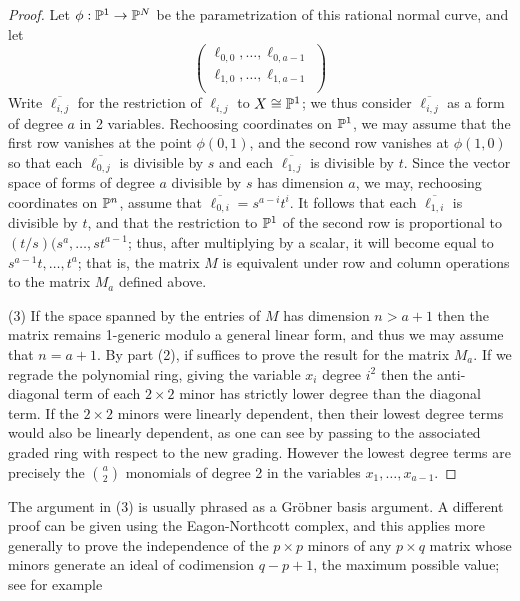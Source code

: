 \begin{proof}
Let $\phi: {\mathbb P}^{1}\to {\mathbb P}^{N}$ be the parametrization of this rational normal curve, and let
$$
\begin{pmatrix}
 \ell_{0,0},\dots, \ell_{0,a-1}\\
  \ell_{1,0},\dots, \ell_{1,a-1}\\
\end{pmatrix}
$$
 Write $\overline{\ell_{i,j}}$ for the restriction of $\ell_{i,j}$ to $X \cong {\mathbb P}^{1}$; we thus consider
  $\overline{\ell_{i,j}}$ as a form of degree $a$ in 2 variables. 
 Rechoosing coordinates on ${\mathbb P}^{1}$, we may assume that the first row vanishes at the point $\phi(0,1)$, and the second row vanishes at $\phi(1,0)$ so that each $\overline{\ell_{0,j}}$ is divisible by $s$ and each $\overline{\ell_{1,j}}$ is divisible by $t$. Since the vector space of forms of degree $a$ divisible by $s$ has dimension $a$, we may, rechoosing coordinates on ${\mathbb P}^{n}$, assume that $\overline{\ell_{0,i}} = s^{a-i}t^{i}$. It follows that
each $\overline{\ell_{1,i}}$ is divisible by $t$, and that the restriction to ${\mathbb P}^{1}$ of the second
row is proportional to $(t/s)(s^{a},\dots,st^{a-1}$; thus, after multiplying by a scalar, it will become
equal to $s^{a-1}t,\dots,t^{a}$; that is, the matrix $M$ is equivalent under row and column operations to the matrix $M_{a}$ defined above.

(3) If the space spanned by the entries of $M$ has dimension $n>a+1$ then the matrix remains 1-generic modulo a general linear form, and thus we may assume that $n=a+1$. By part (2), if suffices to prove
the result for the matrix $M_a$. If we regrade the polynomial ring, giving the variable $x_i$ degree $i^2$
then the anti-diagonal term of each $2\times 2$ minor has strictly lower degree than the diagonal term.
If the $2\times 2$ minors were linearly dependent, then their lowest degree terms would also be linearly dependent, as one can see by passing to the 
associated graded ring with respect to the new grading. However the lowest degree terms are precisely the ${a\choose 2}$ monomials of degree 2
in the variables $x_1, \dots, x_{a-1}$.
\end{proof}

\begin{fact}
The argument in (3) is usually phrased as a Gr\"obner basis argument. A different proof can be given using the Eagon-Northcott complex, and this
applies more generally to prove the independence of the $p\times p$ minors of any $p\times q$ matrix whose minors generate
an ideal of codimension $q-p+1$, the maximum possible value; see for example~\cite{}
\end{fact}

